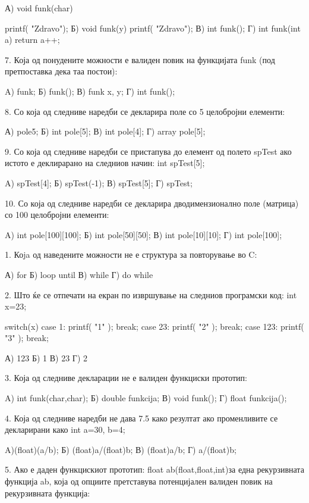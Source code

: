 {{{А) void funk(char) { printf( "Zdravo");
Б) void funk(y) { printf( "Zdravo"); } 
В) int funk();      
Г) int funk(int a) {return a++;}

7. Која од понудените можности е валиден повик на функцијата funk (под претпоставка дека таа постои):

A) funk;                    Б) funk();
В) funk x, y;               Г) int funk();

8. Со која од следниве наредби се декларира поле со 5 целобројни елементи:

А) pole{5};                 Б) int pole[5];
В) int pole[4];             Г) array pole[5];

9. Со која од следниве наредби се пристапува до елемент од полето spTest ако истото е деклирарано на следниов начин: int spTest[5];

A) spTest[4];               Б) spTest(-1);
В) spTest[5];               Г) spTest;

10. Со која од следниве наредби се декларира дводимензионално поле (матрица) со 100 целобројни елементи:

A) int pole[100][100];          Б) int pole[50][50];
В) int pole[10][10];                Г) int pole[100];


1. Коja од наведените можности не е структура за повторување во C:

А) for                  Б) loop until
В) while                           Г) do while

2. Што ќе се отпечати на екран по извршување на следниов програмски код:
int x=23;

switch(x)
{
  case 1: printf( "1" ); break;
  case 23: printf( "2" ); break;
  case 123: printf( "3" ); break;
}

А) 123                  Б) 1
В) 23                   Г) 2   


3. Која од следниве декларации не е валиден функциски прототип:

A) int funk(char,char);     Б) double funkcija;
В) void funk();             Г) float funkcija();

 
4. Која од следниве наредби не дава 7.5 како резултат ако променливите се декларирани како int a=30, b=4;

A)(float)(a/b);                         Б) (float)a/(float)b;
В) (float)a/b;                  Г) a/(float)b;

5.  Ако е даден функцискиот прототип: float ab(float,float,int)за една рекурзивната функција ab, која од опциите претставува потенцијален валиден повик на рекурзивната функција:

}}}}
